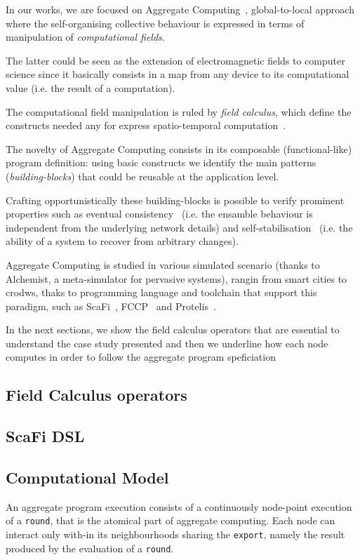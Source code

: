 \documentclass[conference]{IEEEtran}
\newcommand{\round}{\texttt{round}}
\newcommand{\export}{\texttt{export}}
\begin{document}
In our works, we are focused on Aggregate Computing~\cite{DBLP:journals/computer/BealPV15}, global-to-local approach where
 the self-organising collective behaviour is expressed in terms of manipulation of \textit{computational fields}.

The latter could be seen as the extension of electromagnetic fields to computer science since it basically consists in a 
 map from any device to its computational value (i.e. the result of a computation).

The computational field manipulation is ruled by \textit{field calculus}, which define the constructs needed 
 any for express spatio-temporal computation~\cite{DBLP:conf/coordination/AudritoBDV18}.

The novelty of Aggregate Computing consists in its composable (functional-like) program definition: using basic constructs
 we identify the main patterns (\textit{building-blocks}) that could be reusable at the application level.

Crafting opportunistically these building-blocks is possible to verify prominent properties such as eventual consistency~\cite{DBLP:journals/taas/BealVPD17} (i.e. the ensamble behaviour is independent from the underlying network details)
 and self-stabilisation~\cite{DBLP:journals/tomacs/ViroliABDP18} (i.e. the ability of a system to recover from arbitrary changes).

Aggregate Computing is studied in various simulated scenario (thanks to Alchemist, a meta-simulator for pervasive systems), rangin from smart cities to crodws, thaks to programming language and toolchain that support 
 this paradigm, such as ScaFi~\cite{DBLP:conf/ecoop/CasadeiV16}, FCCP~\cite{DBLP:conf/acsos/Audrito20} and Protelis~\cite{PianiniSAC2015}.

In the next sections, we show the field calculus operators that are essential to understand the case study presented and then
 we underline how each node computes in order to follow the aggregate program speficiation 
\subsection{Field Calculus operators}


\subsection{ScaFi DSL}

\subsection{Computational Model}
An aggregate program execution consists of a continuously node-point execution of a \round{}, 
 that is the atomical part of aggregate computing.
%
Each node can interact only with-in its neighbourhoods sharing the \export{}, 
 namely the result produced by the evaluation of a \round{}.
\end{document}

